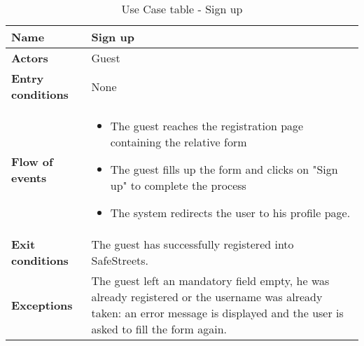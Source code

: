 \begin{table}[!htbp]
\centering
\begin{tabular}{lp{8cm}}
\bf\large Name&\bf\large Sign up\\
\hline
\hline
\bf Actors&Guest\\
\hline
\bf Entry conditions&None\\
\hline
\bf Flow of events&
\begin{itemize}
\item The guest reaches the registration page containing the relative form
\item The guest fills up the form and clicks on "Sign up" to complete the process
\item The system redirects the user to his profile page.
\end{itemize}
\\
\hline
\bf Exit conditions&The guest has successfully registered into SafeStreets. \\
\hline
\bf Exceptions&The guest left an mandatory field empty, he was already registered or the username was already taken: an error message is displayed and the user is asked to fill the form again.\\
\hline

\end{tabular}
\caption{Use Case table - Sign up} \label{tab:signup}
\end{table}
